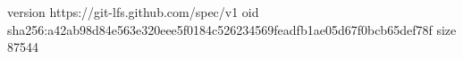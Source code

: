 version https://git-lfs.github.com/spec/v1
oid sha256:a42ab98d84e563e320eee5f0184c526234569feadfb1ae05d67f0bcb65def78f
size 87544
